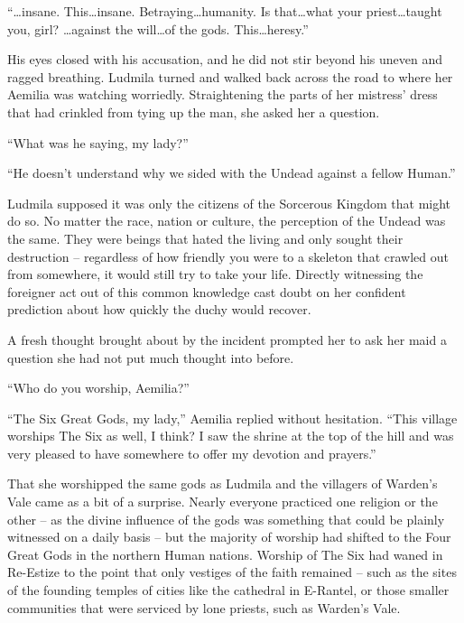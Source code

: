  

“…insane. This…insane. Betraying…humanity. Is that…what your priest…taught you, girl? …against the will…of the gods. This…heresy.”

 

His eyes closed with his accusation, and he did not stir beyond his uneven and ragged breathing. Ludmila turned and walked back across the road to where her Aemilia was watching worriedly. Straightening the parts of her mistress’ dress that had crinkled from tying up the man, she asked her a question.

 

“What was he saying, my lady?”

 

“He doesn’t understand why we sided with the Undead against a fellow Human.”

 

Ludmila supposed it was only the citizens of the Sorcerous Kingdom that might do so. No matter the race, nation or culture, the perception of the Undead was the same. They were beings that hated the living and only sought their destruction – regardless of how friendly you were to a skeleton that crawled out from somewhere, it would still try to take your life. Directly witnessing the foreigner act out of this common knowledge cast doubt on her confident prediction about how quickly the duchy would recover.

 

A fresh thought brought about by the incident prompted her to ask her maid a question she had not put much thought into before.

 

“Who do you worship, Aemilia?”

 

“The Six Great Gods, my lady,” Aemilia replied without hesitation. “This village worships The Six as well, I think? I saw the shrine at the top of the hill and was very pleased to have somewhere to offer my devotion and prayers.”

 

That she worshipped the same gods as Ludmila and the villagers of Warden’s Vale came as a bit of a surprise. Nearly everyone practiced one religion or the other – as the divine influence of the gods was something that could be plainly witnessed on a daily basis – but the majority of worship had shifted to the Four Great Gods in the northern Human nations. Worship of The Six had waned in Re-Estize to the point that only vestiges of the faith remained – such as the sites of the founding temples of cities like the cathedral in E-Rantel, or those smaller communities that were serviced by lone priests, such as Warden’s Vale.

